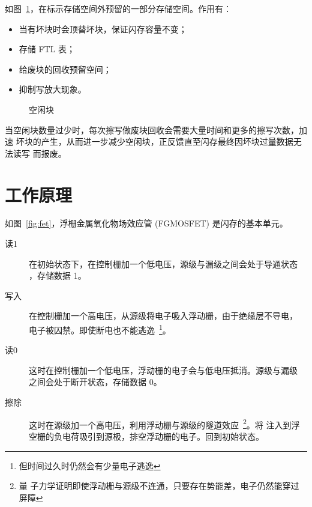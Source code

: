 \documentclass[../main]{subfiles}
\begin{document}
\begin{definition}
  如图~\ref{fig:op}，在标示存储空间外预留的一部分存储空间。作用有：
\end{definition}

\begin{itemize}
  \item 当有坏块时会顶替坏块，保证闪存容量不变；
  \item 存储 FTL 表；
  \item 给废块的回收预留空间；
  \item 抑制写放大现象。
\end{itemize}

\newcommand\myopi{4}
\newcommand\myopj{4}
\begin{figure}[htbp]
  \centering
  \caption{空闲块}%
  \label{fig:op}
\end{figure}

\begin{definition}
  当空闲块数量过少时，每次擦写做废块回收会需要大量时间和更多的擦写次数，加速
  坏块的产生，从而进一步减少空闲块，正反馈直至闪存最终因坏块过量数据无法读写
  而报废。
\end{definition}

\section{工作原理}%
\label{sec:working_principle}

如图~\ref{fig:fet}，浮栅金属氧化物场效应管 (FGMOSFET) 是闪存的基本单元。

\begin{description}
  \item[读1]在初始状态下，在控制栅加一个低电压，源级与漏级之间会处于导通状态
    ，存储数据 1。
  \item[写入]在控制栅加一个高电压，从源级将电子吸入浮动栅，由于绝缘层不导电，
    电子被囚禁。即使断电也不能逃逸~\footnote{但时间过久时仍然会有少量电子逃逸
    }。
  \item[读0]这时在控制栅加一个低电压，浮动栅的电子会与低电压抵消。源级与漏级
    之间会处于断开状态，存储数据 0。
  \item[擦除]这时在源级加一个高电压，利用浮动栅与源级的隧道效应~\footnote{量
    子力学证明即使浮动栅与源级不连通，只要存在势能差，电子仍然能穿过屏障}。将
    注入到浮空栅的负电荷吸引到源极，排空浮动栅的电子。回到初始状态。
\end{description}
\end{document}
